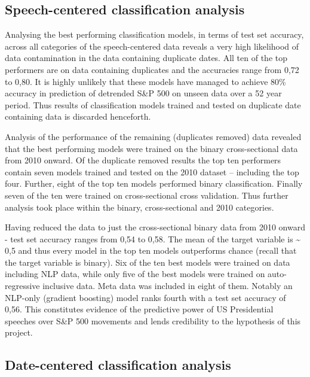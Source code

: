 \documentclass[11pt,preprint, authoryear]{elsarticle}
\numberwithin{equation}{section}
\numberwithin{figure}{section}
\numberwithin{table}{section}
\begin{document}
\hypertarget{speech-centered-classification-analysis}{%
\subsection{\texorpdfstring{Speech-centered classification analysis
\label{speech-centered}}{Speech-centered classification analysis }}\label{speech-centered-classification-analysis}}

Analysing the best performing classification models, in terms of test
set accuracy, across all categories of the speech-centered data reveals
a very high likelihood of data contamination in the data containing
duplicate dates. All ten of the top performers are on data containing
duplicates and the accuracies range from 0,72 to 0,80. It is highly
unlikely that these models have managed to achieve 80\% accuracy in
prediction of detrended S\&P 500 on unseen data over a 52 year period.
Thus results of classification models trained and tested on duplicate
date containing data is discarded henceforth.

Analysis of the performance of the remaining (duplicates removed) data
revealed that the best performing models were trained on the binary
cross-sectional data from 2010 onward. Of the duplicate removed results
the top ten performers contain seven models trained and tested on the
2010 dataset -- including the top four. Further, eight of the top ten
models performed binary classification. Finally seven of the ten were
trained on cross-sectional cross validation. Thus further analysis took
place within the binary, cross-sectional and 2010 categories.

Having reduced the data to just the cross-sectional binary data from
2010 onward - test set accuracy ranges from 0,54 to 0,58. The mean of
the target variable is \textasciitilde{} 0,5 and thus every model in the
top ten models outperforms chance (recall that the target variable is
binary). Six of the ten best models were trained on data including NLP
data, while only five of the best models were trained on auto-regressive
inclusive data. Meta data was included in eight of them. Notably an
NLP-only (gradient boosting) model ranks fourth with a test set accuracy
of 0,56. This constitutes evidence of the predictive power of US
Presidential speeches over S\&P 500 movements and lends credibility to
the hypothesis of this project.

\hypertarget{date-centered-classification-analysis}{%
\subsection{\texorpdfstring{Date-centered classification analysis
\label{Date-centered classification}}{Date-centered classification analysis }}\label{date-centered-classification-analysis}}
\end{document}
